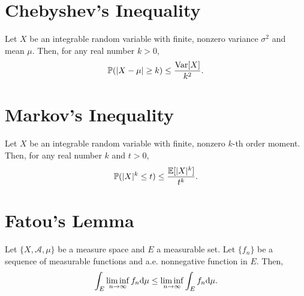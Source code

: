 \section{Chebyshev's Inequality}
\label{Appendix: Chebyshev's Inequality}
\begin{theorem}
    Let $X$ be an integrable random variable with finite, nonzero variance $\sigma^2$ and mean $\mu$. Then, for any real number $k>0$, 
    \begin{equation*}
        \mathbb{P}(|X-\mu| \geq k) \leq \frac{\text{Var}[X]}{k^2}. 
    \end{equation*}
\end{theorem}

\section{Markov's Inequality}
\label{Appendix: Markov's Inequality}
\begin{theorem}
    Let $X$ be an integrable random variable with finite, nonzero $k$-th order moment. Then, for any real number $k$ and $t>0$,
    \begin{equation*}
        \mathbb{P}(|X|^k \leq t) \leq \frac{\mathbb{E}[|X|^k]}{t^k}.
    \end{equation*}
\end{theorem}

\section{Fatou's Lemma}
\label{Appendix: Fatou's Lemma}
\begin{lemma} 
    Let $\{X, \mathcal A, \mu \}$ be a measure space and $E$ a measurable set. Let $\{f_n\}$ be a sequence of measurable functions and a.e. nonnegative function in $E$. Then,
    \begin{equation*}
        \int_E \liminf_{n \rightarrow \infty} f_n \mathrm{d} \mu \leq \liminf_{n \rightarrow \infty} \int_E f_n \mathrm{d} \mu.
    \end{equation*}
\end{lemma}

